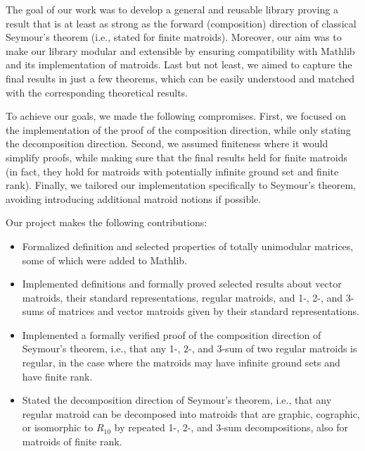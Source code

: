 The goal of our work was to develop a general and reusable library proving a result that is at least as strong as the forward (composition) direction of classical Seymour's theorem (i.e., stated for finite matroids). Moreover, our aim was to make our library modular and extensible by ensuring compatibility with Mathlib and its implementation of matroids. Last but not least, we aimed to capture the final results in just a few theorems, which can be easily understood and matched with the corresponding theoretical results.

To achieve our goals, we made the following compromises. First, we focused on the implementation of the proof of the composition direction, while only stating the decomposition direction. Second, we assumed finiteness where it would simplify proofs, while making sure that the final results held for finite matroids (in fact, they hold for matroids with potentially infinite ground set and finite rank). Finally, we tailored our implementation specifically to Seymour's theorem, avoiding introducing additional matroid notions if possible.

Our project makes the following contributions:
\begin{itemize}
    \item Formalized definition and selected properties of totally unimodular matrices, some of which were added to Mathlib.
    \item Implemented definitions and formally proved selected results about vector matroids, their standard representations, regular matroids, and 1-, 2-, and 3-sums of matrices and vector matroids given by their standard representations.
    \item Implemented a formally verified proof of the composition direction of Seymour's theorem, i.e., that any 1-, 2-, and 3-sum of two regular matroids is regular, in the case where the matroids may have infinite ground sets and have finite rank.
    \item Stated the decomposition direction of Seymour's theorem, i.e., that any regular matroid can be decomposed into matroids that are graphic, cographic, or isomorphic to $R_{10}$ by repeated 1-, 2-, and 3-sum decompositions, also for matroids of finite rank.
\end{itemize}

